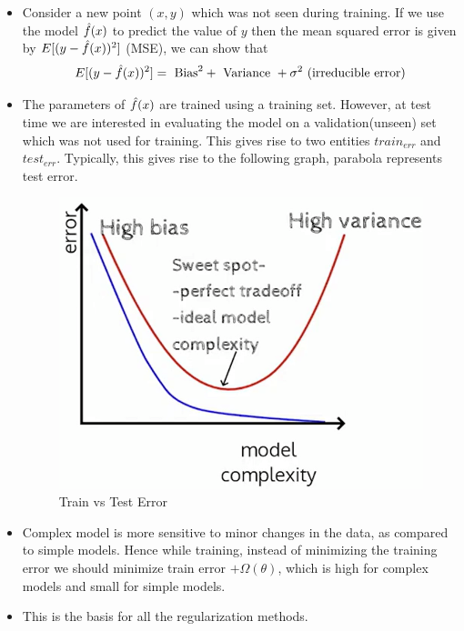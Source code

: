 \documentclass[a4paper]{article}
\begin{document}
\begin{itemize}
    \item Consider a new point $(x,y)$ which was not seen during training. If we use the model $\Hat{f}(x)$ to predict the value of $y$ then the mean squared error is given by $E[(y-\Hat{f}(x))^2]$ (MSE), we can show that
    \begin{equation*}
        E[(y-\Hat{f}(x))^2]=\text{ Bias}^2+\text{ Variance }+\sigma^2\text{ (irreducible error)}
    \end{equation*}
    \item The parameters of $\Hat{f}(x)$ are trained using a training set. However, at test time we are interested in evaluating the model on a validation(unseen) set which was not used for training. This gives rise to two entities $train_{err}$ and $test_{err}$. Typically, this gives rise to the following graph, parabola represents test error.
    \begin{figure}[H]
        \centering
        \includegraphics[width=0.5\linewidth]{Degree//static/DL_train_vs_test.png}
        \caption{Train vs Test Error}
        \label{fig:DL-train-vs-test}
    \end{figure}
    \item Complex model is more sensitive to minor changes in the data, as compared to simple models. Hence while training, instead of minimizing the training error we should minimize train error $+\Omega(\theta)$, which is high for complex models and small for simple models.
    \item This is the basis for all the regularization methods.
\end{itemize}
\end{document}
